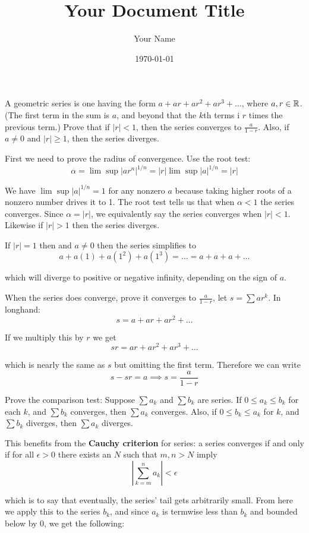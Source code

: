 \documentclass{article}
\title{Your Document Title}
\author{Your Name}
\date{\today} %
\begin{document}
\maketitle
\begin{problem}
A geometric series is one having the form $a + ar + ar^2 + ar^3 + \ldots$, where $a, r \in \mathbb{R}$. (The first term in the sum is $a$, and beyond that the $k$th terms i $r$ times the previous term.) Prove that if $|r| < 1$, then the series converges to $\frac{a}{1 - r}$. Also, if $a \neq 0$ and $|r| \geq 1$, then the series diverges.
\end{problem}

First we need to prove the radius of convergence. Use the root test:
$$\alpha = \lim \sup |ar^n|^{1/n} = |r| \lim \sup |a|^{1/n} = |r|$$

We have $\lim \sup |a|^{1/n} = 1$ for any nonzero $a$ because taking higher roots of a nonzero number drives it to 1. The root test tells us that when $\alpha < 1$ the series converges. Since $\alpha = |r|$, we equivalently say the series converges when $|r| < 1$. Likewise if $|r| > 1$ then the series diverges.

If $|r| = 1$ then and $a \neq 0$ then the series simplifies to
$$a + a(1) + a(1^2) + a(1^3) = \ldots = a + a + a + \ldots$$

which will diverge to positive or negative infinity, depending on the sign of $a$.

When the series does converge, prove it converges to $\frac{a}{1 - r}$, let $s = \sum ar^k$. In longhand:
$$s = a + ar + ar^2 + \ldots$$

If we multiply this by $r$ we get
$$sr = ar + ar^2 + ar^3 + \ldots$$

which is nearly the same as $s$ but omitting the first term. Therefore we can write
$$s - sr = a \implies s = \frac{a}{1 - r}$$

\begin{problem}
Prove the comparison test: Suppose $\sum a_k$ and $\sum b_k$ are series. If $0 \leq a_k \leq b_k$ for each $k$, and $\sum b_k$ converges, then $\sum a_k$ converges. Also, if $0 \leq b_k \leq a_k$ for $k$, and $\sum b_k$ diverges, then $\sum a_k$ diverges.
\end{problem}

This benefits from the \textbf{Cauchy criterion} for series: a series converges if and only if for all $\epsilon > 0$ there exists an $N$ such that $m, n > N$ imply
$$\left|\sum_{k = m}^n a_k\right| < \epsilon$$

which is to say that eventually, the series' tail gets arbitrarily small. From here we apply this to the series $b_k$, and since $a_k$ is termwise less than $b_k$ and bounded below by 0, we get the following:
\end{document}

